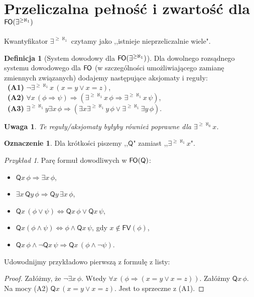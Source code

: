\documentclass{article}
\theoremstyle{plain}
\newtheorem{uw}[thm]{Uwaga}
\theoremstyle{definition}
\newtheorem{df}[thm]{Definicja}
\newtheorem{ozn}[thm]{Oznaczenie}
\theoremstyle{remark}
\newtheorem{prz}[thm]{Przykład}
\newcommand{\FO}{\mathsf{F \mkern-1.4mu O}}
\newcommand{\q}{\mathsf{Q}}
\begin{document}

\section{Przeliczalna pełność i zwartość dla $\FO(\exists^{\geq \aleph_1})$}

Kwantyfikator $\exists^{\geq \aleph_1}$ czytamy jako ,,istnieje nieprzeliczalnie wiele".

\begin{df}[System dowodowy dla $\FO(\exists^{\geq \aleph_1})$]
	 Dla dowolnego rozsądnego systemu dowodowego dla $\FO$ (w szczególności umożliwiającego zamianę zmiennych związanych)
	 dodajemy następujące aksjomaty i reguły:
	 \\\mbox{  }\textbf{(A1)} $\neg \exists^{\geq \aleph_1} x \, (x = y \vee x = z)$,
	 \\\mbox{  }\textbf{(A2)} $\forall x \,(\phi \Rightarrow \psi) \Rightarrow (\exists^{\geq \aleph_1} x \, \phi \Rightarrow \exists^{\geq \aleph_1} x \, \psi)$,
	 \\\mbox{  }\textbf{(A3)} $\exists^{\geq \aleph_1} y \exists x \, \phi \Rightarrow (\exists x \exists^{\geq \aleph_1} y \, \phi \vee \exists^{\geq \aleph_1} \exists y \, \phi)$.

\end{df}

\begin{uw}
	Te reguły/aksjomaty byłyby również poprawne dla $\exists^{\geq \aleph_0} x$.
\end{uw}

\begin{ozn}
	Dla krótkości piszemy ,,$\q$" zamiast ,,$\exists^{\geq \aleph_1} x$".
\end{ozn}

\begin{prz}
	Parę formuł dowodliwych w $\FO(\q)$:
	\begin{itemize}
		\item $\q x \, \phi \Rightarrow \exists x \, \phi$,
		\item $\exists x \,\q y \, \phi \Rightarrow \q y \, \exists x \, \phi$,
		\item $\q x \, (\phi \vee \psi) \iff \q x \, \phi \vee \q x \, \psi$,
		\item $\q x (\phi \wedge \psi) \iff \phi \wedge \q x \, \psi$, gdy $x \not \in \mathsf{FV}(\phi)$,
		\item $\q x \, \phi \wedge \neg \q x \, \psi \Rightarrow \q x \, (\phi \wedge \neg \psi)$.
	\end{itemize}
\end{prz}
Udowodnijmy przykładowo pierwszą z formułę z listy:
\begin{proof}
	 Załóżmy, że $\neg \exists x \, \phi$.
	 Wtedy $\forall x \, (\phi \Rightarrow (x = y \vee x = z))$.
	 Załóżmy $\q x \, \phi$.
	 Na mocy (A2) $\q x \, (x = y \vee x = z)$.
	 Jest to sprzeczne z (A1).
\end{proof}
\end{document}
